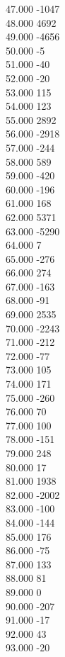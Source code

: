 { 47.000	-1047 \\
 48.000	4692 \\
 49.000	-4656 \\
 50.000	-5 \\
 51.000	-40 \\
 52.000	-20 \\
 53.000	115 \\
 54.000	123 \\
 55.000	2892 \\
 56.000	-2918 \\
 57.000	-244 \\
 58.000	589 \\
 59.000	-420 \\
 60.000	-196 \\
 61.000	168 \\
 62.000	5371 \\
 63.000	-5290 \\
 64.000	7 \\
 65.000	-276 \\
 66.000	274 \\
 67.000	-163 \\
 68.000	-91 \\
 69.000	2535 \\
 70.000	-2243 \\
 71.000	-212 \\
 72.000	-77 \\
 73.000	105 \\
 74.000	171 \\
 75.000	-260 \\
 76.000	70 \\
 77.000	100 \\
 78.000	-151 \\
 79.000	248 \\
 80.000	17 \\
 81.000	1938 \\
 82.000	-2002 \\
 83.000	-100 \\
 84.000	-144 \\
 85.000	176 \\
 86.000	-75 \\
 87.000	133 \\
 88.000	81 \\
 89.000	0 \\
 90.000	-207 \\
 91.000	-17 \\
 92.000	43 \\
 93.000	-20 \\
}
